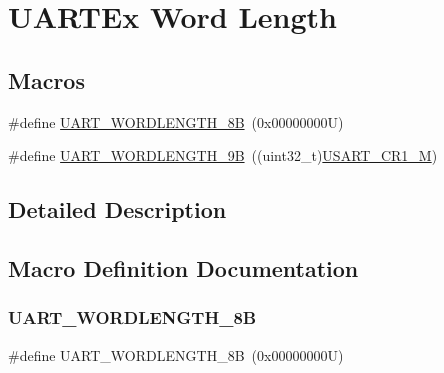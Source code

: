 \hypertarget{group___u_a_r_t_ex___word___length}{}\section{U\+A\+R\+T\+Ex Word Length}
\label{group___u_a_r_t_ex___word___length}
\subsection*{Macros}
\begin{DoxyCompactItemize}
\item 
\#define \hyperlink{group___u_a_r_t_ex___word___length_gaf394e9abaf17932ee89591f990fe6407}{U\+A\+R\+T\+\_\+\+W\+O\+R\+D\+L\+E\+N\+G\+T\+H\+\_\+8B}~(0x00000000\+U)
\item 
\#define \hyperlink{group___u_a_r_t_ex___word___length_gaf867be43de35fd3c32fe0b4dd4058f7e}{U\+A\+R\+T\+\_\+\+W\+O\+R\+D\+L\+E\+N\+G\+T\+H\+\_\+9B}~((uint32\+\_\+t)\hyperlink{group___peripheral___registers___bits___definition_ga95f0288b9c6aaeca7cb6550a2e6833e2}{U\+S\+A\+R\+T\+\_\+\+C\+R1\+\_\+M})
\end{DoxyCompactItemize}


\subsection{Detailed Description}


\subsection{Macro Definition Documentation}
\mbox{\label{group___u_a_r_t_ex___word___length_gaf394e9abaf17932ee89591f990fe6407}} 
\subsubsection{\texorpdfstring{U\+A\+R\+T\+\_\+\+W\+O\+R\+D\+L\+E\+N\+G\+T\+H\+\_\+8B}{UART\_WORDLENGTH\_8B}}
{\footnotesize\ttfamily \#define U\+A\+R\+T\+\_\+\+W\+O\+R\+D\+L\+E\+N\+G\+T\+H\+\_\+8B~(0x00000000\+U)}

